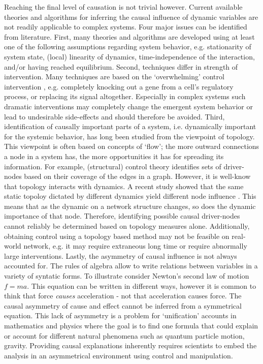 \documentclass[twoside, twocolumn]{article}
\begin{document}
	Reaching the final level of causation is not trivial however. Current available theories and algorithms for inferring the causal influence of dynamic variables are not readily applicable to complex systems. Four major issues can be identified from literature. First, many theories and algorithms are developed using at least one of the following assumptions regarding system behavior, e.g. stationarity of system state, (local) linearity of dynamics\cite{Chen2017, Liu2016a}, time-independence of the interaction, and/or having reached equilibrium. Second, techniques differ in strength of intervention. Many techniques are based on the `overwhelming' control intervention \cite{Chen2017}, e.g. completely knocking out a gene from a cell's regulatory process, or replacing its signal altogether. Especially in complex systems such dramatic interventions may completely change the emergent system behavior or lead to undesirable side-effects and should therefore be avoided.
	Third, identification of causally important parts of a system, i.e. dynamically important for the systemic behavior, has long been studied from the viewpoint of topology\cite{Harush2017a,Sikic2013,Cowan2012, Muldoon2016, Yan2017, Pequito2017}. This viewpoint is often based on concepts of `flow'; the more outward connections a node in a system has, the more opportunities it has for spreading its information. For example, (structural) control theory identifies sets of driver-nodes based on their coverage of the edges in a graph. However, it is well-know that topology interacts with dynamics\cite{Cowan2012, Harush2017a, Gates2016}. A recent study showed that the same static topoloy dictated by different dynamics yield different node influence \cite{Harush2017a}. This means that as the dynamic on a network structure changes, so does the dynamic importance of that node. Therefore, identifying possible causal driver-nodes cannot reliably be determined based on topology measures alone. Additionally, obtaining control using a topology based method may not be feasible on real-world network, e.g. it may require extraneous long time \cite{Pequito2017} or require abnormally large interventions\cite{Cowan2012, Yan2012}.
	Lastly, the asymmetry of causal influence is not always accounted for. The rules of algebra allow to write relations between variables in a variety of syntatic forms. To illustrate consider Newton's second law of motion $f = m a$. This equation can be written in different ways, however it is common to think that force \textit{causes} acceleration - not that acceleration causes force. The causal asymmetry of cause and effect cannot be inferred from a symmetrical equation. This lack of asymmetry is a problem for `unification' accounts in mathematics and physics where the goal is to find one formula that could explain or account for different natural phenomena such as quantum particle motion, gravity. Providing causal explanations inherently requires scientists to embed the analysis in an asymmetrical environment using control and manipulation.
\end{document}
